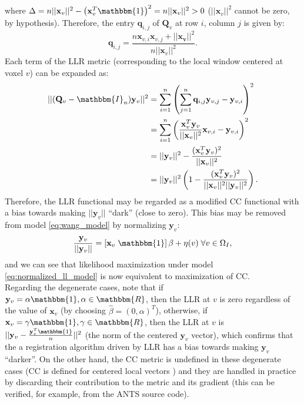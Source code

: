 where $\Delta = n||\mathbf{x}_{v}||^{2} - \left(\mathbf{x}_{v}^{T}\mathbbm{1}\right)^{2} = n||\mathbf{x}_{v}||^{2} > 0$ ($||\mathbf{x}_{v}||^{2}$ cannot be zero, by hypothesis). Therefore, the entry $\mathbf{q}_{i,j}$ of $\mathbf{Q}_v$ at row $i$, column $j$ is given by:
\begin{displaymath}
    \mathbf{q}_{i,j} = \frac{n\mathbf{x}_{v,i}\mathbf{x}_{v,j} + ||\mathbf{x_v}||^{2}}{n||\mathbf{x}_{v}||^{2}}.
\end{displaymath}
Each term of the LLR metric (corresponding to the local window centered at voxel $v$) can be expanded as:
\begin{equation}\label{eq:llr_cc_relationship}
    \begin{split}
        ||(\mathbf{Q}_{v} - \mathbbm{I}_{n})\mathbf{y}_{v}||^{2} &= \sum_{i=1}^{n} \left(\sum_{j=1}^{n} \mathbf{q}_{i,j} \mathbf{y}_{v,j} - \mathbf{y}_{v,i}\right)^{2}\\
        &=\sum_{i=1}^{n}\left(\frac{\mathbf{x}_{v}^{T}\mathbf{y}_{v}}{||\mathbf{x}_{v}||^{2}} \mathbf{x}_{v,i} - \mathbf{y}_{v,i}\right)^{2} \\
        &=||\mathbf{y}_{v}||^{2} - \frac{(\mathbf{x}_{v}^{T}\mathbf{y}_{v})^{2}}{||\mathbf{x}_{v}||^{2}}\\
        &= ||\mathbf{y}_{v}||^{2}\left(1 - \frac{(\mathbf{x}_{v}^{T}\mathbf{y}_{v})^{2}}{||\mathbf{x}_{v}||^{2}||\mathbf{y}_{v}||^{2}}\right).
    \end{split}
\end{equation}
Therefore, the LLR functional may be regarded as a modified CC functional with a bias towards making $||\mathbf{y}_{v}||$ ``dark'' (close to zero). This bias may be removed from model \eqref{eq:wang_model} by normalizing $\mathbf{y}_{v}$:\\
\begin{equation}\label{eq:normalized_ll_model}
    \frac{\mathbf{y}_{v}}{||\mathbf{y}_{v}||} = \left[\mathbf{x}_{v} \; \mathbbm{1}\right]\beta + \eta(v) \; \forall v\in\Omega_{I},
\end{equation}
and we can see that likelihood maximization under model \eqref{eq:normalized_ll_model} is now equivalent to maximization of CC.\\

Regarding the degenerate cases, note that if $\mathbf{y}_{v} = \alpha \mathbbm{1}, \alpha\in \mathbbm{R}$, then the LLR at $v$ is zero regardless of the value of $\mathbf{x}_{v}$ (by choosing $\widehat{\beta} = (0, \alpha)^{T}$), otherwise, if $\mathbf{x}_{v} = \gamma \mathbbm{1}, \gamma\in \mathbbm{R}$, then the LLR at $v$ is $||\mathbf{y}_{v} - \frac{\mathbf{y}_{v}^{T}\mathbbm{1}}{n}||^{2}$ (the norm of the centered $\mathbf{y}_{v}$ vector), which confirms that the a registration algorithm driven by LLR has a bias towards making $\mathbf{y}_{v}$ ``darker''. On the other hand, the CC metric is undefined in these degenerate cases (CC is defined for centered local vectors \cite{Avants2008}\cite{Avants2011}) and they are handled in practice by discarding their contribution to the metric and its gradient (this can be verified, for example, from the ANTS \cite{Avants2011a} source code).

